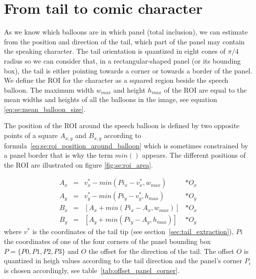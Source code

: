 \section{From tail to comic character} %
\label{sec:from_tail_to_comic_character}



As we know which balloons are in which panel (total inclusion), we can estimate from the position and direction of the tail, which part of the panel may contain the speaking character.
The tail orientation is quantized in eight cones of $\pi/4$ radius so we can consider that, in a rectangular-shaped panel (or its bounding box), the tail is either pointing towards a corner or towards a border of the panel.
We define the ROI for the character as a squared region beside the speech balloon.
The maximum width $w_{max}$ and height $h_{max}$ of the ROI are equal to the mean widths and heights of all the balloons in the image, see equation \ref{eq:se:mean_balloon_size}.

The position of the ROI around the speech balloon is defined by two opposite points of a square $A_{x,y}$ and $B_{x,y}$ according to formula~\ref{eq:se:roi_position_around_balloon} which is sometimes constrained by a panel border that is why the term $min()$ appears.
The different positions of the ROI are illustrated on figure \ref{fig:se:roi_area}.

\begin{equation}
  \label{eq:se:roi_position_around_balloon}
  \begin{array}{rccl} 
	  A_x & = & v^*_x - min(Pi_x - v^*_x, w_{max}) & * O_x \\ 
	  A_y & = & v^*_y - min(Pi_y - v^*_y, h_{max}) & * O_y \\ 
	  B_x & = & \left[ A_x + min(Pi_x - A_x, w_{max}) \right] & * O_x \\ 
	  B_y & = & \left[ A_y + min(Pi_y - A_y, h_{max}) \right] & * O_y
  \end{array} 
\end{equation}
where $v^*$ is the coordinates of the tail tip (see section~\ref{sec:tail_extraction}), $Pi$ the coordinates of one of the four corners of the panel bounding box $P=\{P0, P1, P2, P3\}$ and $O$ the offset for the direction of the tail.
The offset $O$ is quantized in heigh values according to the tail direction and the panel's corner $P_i$ is chosen accordingly, see table~\ref{tab:offset_panel_corner}.

